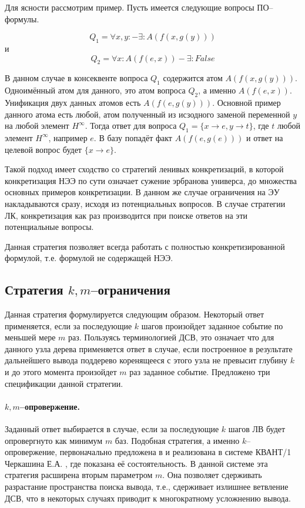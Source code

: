 Для ясности рассмотрим пример. Пусть имеется следующие вопросы ПО--формулы.

$$Q_1 = \forall x,y: - \exists: A(f(x,g(y)))$$
и
$$Q_2 = \forall x:A(f(e,x)) - \exists: False$$

В данном случае в консеквенте вопроса $Q_1$ содержится атом $A(f(x,g(y)))$. Одноимённый атом для данного, это атом вопроса $Q_2$, а именно $A(f(e,x))$. Унификация двух данных атомов есть $A(f(e,g(y)))$. Основной пример данного атома есть любой, атом полученный из исзодного заменой переменной $y$ на любой элемент $H^{\infty}$. Тогда ответ для вопроса $Q_1 = \{x \rightarrow e, y \rightarrow t\}$, где $t$ любой элемент $H^{\infty}$, например $e$. В базу попадёт факт $A(f(e,g(e)))$ и ответ на целевой вопрос будет $\{x \rightarrow e\}$. 

Такой подход имеет сходство со стратегий ленивых конкретизаций, в которой конкретизация НЭЭ по сути означает сужение эрбранова универса, до множества основных примеров конкретизации. В данном же случае ограничения на ЭУ накладываются сразу, исходя из потенциальных вопросов. В случае стратегии ЛК, конкретизация как раз производится при поиске ответов на эти потенциальные вопросы. 

Данная стратегия позволяет всегда работать с полностью конкретизированной формулой, т.е. формулой не содержащей НЭЭ.


\subsection{Стратегия $k,m$--ограничения}
Данная стратегия формулируется следующим образом. Некоторый ответ применяется, если за последующие $k$ шагов произойдет заданное событие по меньшей мере $m$ раз. Пользуясь терминологией ДСВ, это означает что для данного узла дерева применяется ответ в случае, если построенное в результате дальнейшего вывода поддерево коренящееся с этого узла не превысит глубину $k$ и до этого момента произойдет $m$ раз заданное событие. Предложено три спецификации данной стратегии.

\paragraph{$k,m$--опровержение.} Заданный ответ выбирается в случае, если за последующие $k$ шагов ЛВ будет опровергнуто как минимум $m$ баз. Подобная стратегия, а именно $k$--опровержение, первоначально предложена в \cite{ICDS2000} и реализована в системе КВАНТ/1 Черкашина Е.А. \cite{dissChe}, где показана её состоятельность. В данной системе эта стратегия расширена вторым параметром $m$. Она позволяет сдерживать разрастание пространства поиска вывода, т.е., сдерживает излишнее ветвление ДСВ, что в некоторых случаях приводит к многократному усложнению вывода.

